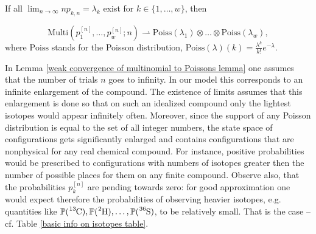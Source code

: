 \begin{lemma}\label{weak convergence of multinomial to Poissons lemma}
	If all\,\,$\lim_{n\to \infty} n p_{k,n}= \lambda_k$ exist for $k \in \{1,\dots, w\}$, then 
	
	\begin{equation}\label{weak convergence of multionial to Poissons equation}
		\mathrm{Multi}\left( p_1^{[n]}, \dots, p_w^{[n]}; n \right) 
			\rightharpoonup 
		\mathrm{Poiss}( \lambda_1) \otimes \dots \otimes \mathrm{Poiss}( \lambda_w ),	
	\end{equation}
	where $\mathrm{Poiss}$ stands for the Poisson distribution, $\mathrm{Poiss}(\lambda)(k) 	= \frac{\lambda^k}{k!}e^{-\lambda}$.
	
\end{lemma}


In Lemma \ref{weak convergence of multinomial to Poissons lemma} one assumes that the number of trials $n$ goes to infinity. In our model this corresponds to an infinite enlargement of the compound. The existence of limits assumes that this enlargement is done so that on such an idealized compound only the lightest isotopes would appear infinitely often. Moreover, since the support of any Poisson distribution is equal to the set of all integer numbers, the state space of configurations gets significantly enlarged and contains configurations that are nonphysical for any real chemical compound. For instance, positive probabilities would be prescribed to configurations with numbers of isotopes greater then the number of possible places for them on any finite compound. Observe also, that the probabilities $p_k^{[n]}$ are pending towards zero: for good approximation one would expect therefore the probabilities of observing heavier isotopes, e.g. quantities like $\prob(\cem{^{13}C}), \prob(\cem{^{2}H}), \dots, \prob(\cem{^{36}S})$, to be relatively small. That is the case -- cf. Table \ref{basic info on isotopes table}.


